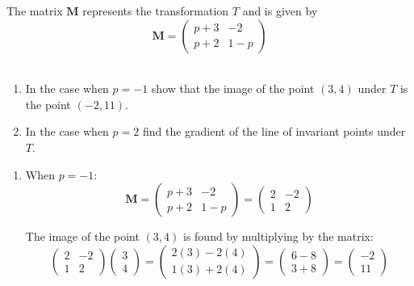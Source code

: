 \documentclass[leqno]{article}
\begin{document}
\djsFrontMatter
\begin{enumerate}[
  label=\textbf{\arabic*.},
  leftmargin=*,
  topsep=0pt,
  partopsep=0pt,
  parsep=0pt
]

\questionitem

The matrix $\mathbf{M}$ represents the transformation $T$ and is given by
\[
\mathbf{M} = \begin{pmatrix}
p + 3 & -2 \\[6pt]
 p + 2 & 1 - p
\end{pmatrix}
\] \\
\begin{enumerate}[label=\textbf{(\alph*)}]
  \item In the case when $p = -1$ show that the image of the point $(3, 4)$ under $T$ is the point $(-2, 11)$.  \\
  \item In the case when $p = 2$ find the gradient of the line of invariant points under $T$.  \\
\end{enumerate}

\vspace*{10pt}

\begin{djsSolution}
\begin{enumerate}[label=\textbf{(\alph*)}]
  \item When $p=-1$:
\[
\mathbf{M}=\begin{pmatrix}
p+3 & -2\\
p+2 & 1-p
\end{pmatrix}
=
\begin{pmatrix}
2 & -2\\
1 & 2
\end{pmatrix}
\]

The image of the point $(3,4)$ is found by multiplying by the matrix:
\[
\begin{pmatrix}
2 & -2\\
1 & 2
\end{pmatrix}
\begin{pmatrix}
3\\
4
\end{pmatrix}
=
\begin{pmatrix}
2(3)-2(4)\\
1(3)+2(4)
\end{pmatrix}
=
\begin{pmatrix}
6-8\\
3+8
\end{pmatrix}
=
\begin{pmatrix}
-2\\
11
\end{pmatrix}
\]


\end{enumerate}
\end{djsSolution}
\end{enumerate}
\end{document}
